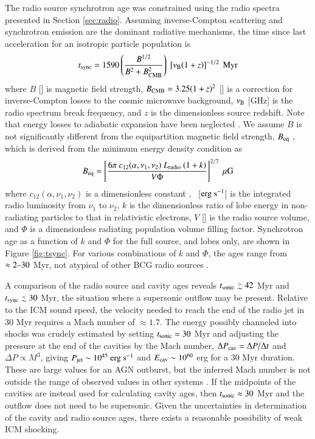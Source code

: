 \documentclass[referee,traditabstract]{aa}
\begin{document}
The radio source synchrotron age was constrained using the radio
spectra presented in Section \ref{sec:radio}. Assuming inverse-Compton
scattering and synchrotron emission are the dominant radiative
mechanisms, the time since last acceleration for an isotropic particle
population is \citep{2001AJ....122.1172S}
\begin{equation}
  t_{\rm{sync}} = 1590 \left(\frac{B^{1/2}}{B^2 + B_{\rm{CMB}}^2}\right)~
  \left[\nu_{\rm{B}} (1+z)\right]^{-1/2} ~\mbox{\ensuremath{\rm{Myr}}}
\end{equation}
where $B$ [\mg] is magnetic field strength, $B_{\rm{CMB}} =
3.25(1+z)^2$ [\mg] is a correction for inverse-Compton losses to the
cosmic microwave background, $\nu_{\rm{B}}$ [GHz] is the radio
spectrum break frequency, and $z$ is the dimensionless source
redshift. Note that energy losses to adiabatic expansion have been
neglected \citep{1968ARA&A...6..321S}. We assume $B$ is not
significantly different from the equipartition magnetic field
strength, $B_{\rm{eq}}$ \citep[see][regarding the validity of this
  assumption]{birzan08}, which is derived from the minimum energy
density condition as \citep{1980ARA&A..18..165M}
\begin{equation}
  B_{\rm{eq}} = \left[\frac{6 \pi ~c_{12}(\alpha,\nu_1, \nu_2)
      ~L_{\rm{radio}} ~(1+k)}{V \Phi}\right]^{2/7} ~\rm{\mbox{\ensuremath{\rm{\mu G}}}}
\end{equation}
where $c_{12}(\alpha,\nu_1,\nu_2)$ is a dimensionless constant
\citep{pach}, \lrad\ [$\rm{\mbox{\ensuremath{\rm{erg}}}~\ensuremath{\rm{\mbox{\ensuremath{\rm{s}}}^{-1}}}}$] is the integrated radio luminosity from
$\nu_1$ to $\nu_2$, $k$ is the dimensionless ratio of lobe energy in
non-radiating particles to that in relativistic electrons, $V$ [\cc]
is the radio source volume, and $\Phi$ is a dimensionless radiating
population volume filling factor. Synchrotron age as a function of $k$
and $\Phi$ for the full source, and lobes only, are shown in Figure
\ref{fig:tsync}. For various combinations of $k$ and $\Phi$, the ages
range from $\approx 2 \mbox{--} 30$ Myr, not atypical of other BCG radio
sources \citep[\eg][]{birzan08}.

A comparison of the radio source and cavity ages reveals $\tsonic \ga
42$ Myr and $\tsync \la 30$ Myr, the situation where a supersonic
outflow may be present. Relative to the ICM sound speed, the velocity
needed to reach the end of the radio jet in 30 Myr requires a Mach
number of $\approx 1.7$. The energy possibly channeled into shocks was
crudely estimated by setting $t_{\rm{sonic}} = 30$ Myr and adjusting
the pressure at the end of the cavities by the Mach number, $\Delta
P_{\rm{cav}} = \Delta P / \Delta t$ and $\Delta P \propto M^3$, giving $P_{\rm{jet}}
\sim 10^{45} ~\rm{\mbox{\ensuremath{\rm{erg}}}~\ensuremath{\rm{\mbox{\ensuremath{\rm{s}}}^{-1}}}}$ and $E_{\rm{cav}} \sim 10^{60}$ erg for a 30 Myr
duration. These are large values for an AGN outburst, but the inferred
Mach number is not outside the range of observed values in other
systems \citep[\eg][]{2005ApJ...635..894F, ms0735, hydraa,
  2009MNRAS.395.1999C}. If the midpoints of the cavities are instead
used for calculating cavity ages, then $t_{\rm{sonic}} \approx 30$ Myr and
the outflow does not need to be supersonic. Given the uncertainties in
determination of the cavity and radio source ages, there exists a
reasonable possibility of weak ICM shocking.
\end{document}

